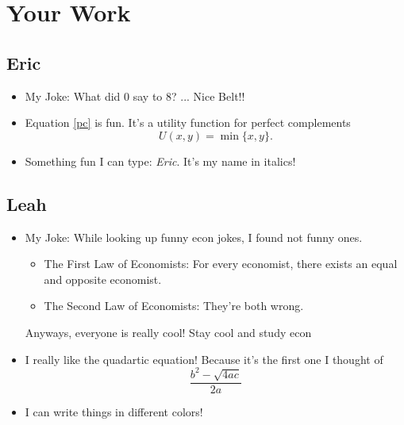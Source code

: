 \documentclass{article}
\begin{document}
	\section{Your Work}
	
	\subsection{Eric}
	
	\begin{itemize}
		\item My Joke: What did $0$ say to $8$? ... Nice Belt!!
		\item Equation \ref{pc} is fun. It's a utility function for perfect complements
		\begin{equation}\label{pc}
		U(x,y) = \min\{x,y\}.
		\end{equation}
		\item Something fun I can type: \emph{Eric}. It's my name in italics!
	\end{itemize}
	
	
	\subsection{Leah}
	
	\begin{itemize}
		\item My Joke: 
		While looking up funny econ jokes, I found not funny ones.
		\begin{itemize}
			\item The First Law of Economists: For every economist, there exists an equal and opposite economist.
			\item The Second Law of Economists: They’re both wrong.
		\end{itemize} 
		Anyways, everyone is really cool! Stay cool and study econ 
		
		
		\item I really like the {quadartic} equation! Because it's the first one I thought of
		\begin{equation} \label{quadratic}
		\frac{b^2-\sqrt{4ac}}{2a}
		\end{equation}
		\color{blue}
		\item I can write things in different colors! 
	\end{itemize}
	
\end{document}
